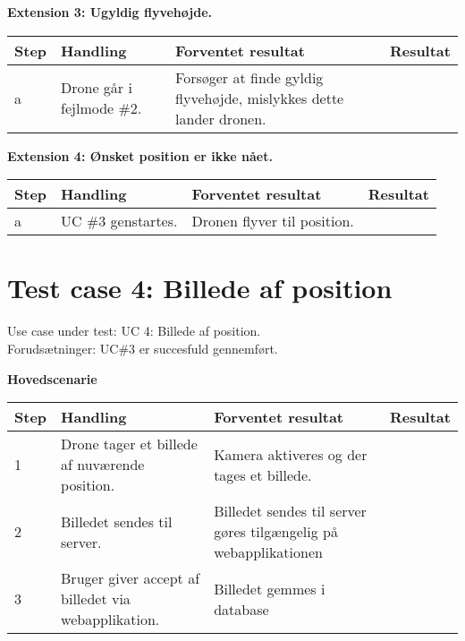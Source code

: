 \textbf{Extension 3: Ugyldig flyvehøjde.}
\begin{table}[H]
	\centering
		\begin{tabular}{|l|p{5 cm}|p{5 cm}|p{3.5 cm}|} 
		\hline
			Step & Handling & Forventet resultat & Resultat\\ \hline
			a & Drone går i fejlmode \#2. & Forsøger at finde gyldig \newline flyvehøjde, mislykkes dette lander dronen. & \\ \hline
		\end{tabular}
\end{table}

\textbf{Extension 4: Ønsket position er ikke nået.}
\begin{table}[H]
	\centering
		\begin{tabular}{|l|p{5 cm}|p{5 cm}|p{3.5 cm}|} 
		\hline
			Step & Handling & Forventet resultat & Resultat\\ \hline
			a & UC \#3 genstartes. & Dronen flyver til position. & \\ \hline
		\end{tabular}
\end{table}

\newpage

\section{Test case 4: Billede af position}
Use case under test: UC 4: Billede af position.\\
Forudsætninger:	UC\#3 er succesfuld gennemført.

\textbf{Hovedscenarie}
\begin{table}[H]
	\centering
		\begin{tabular}{|l|p{5 cm}|p{5 cm}|p{3.5 cm}|} 
		\hline
			Step & Handling & Forventet resultat & Resultat\\ \hline
			1 & Drone tager et billede af \newline nuværende position. & Kamera aktiveres og der \newline tages et billede. & \\ \hline
			2 & Billedet sendes til server. & Billedet sendes til server gøres tilgængelig på \newline webapplikationen &  \\ \hline
			3 & Bruger giver accept af billedet via webapplikation. & Billedet gemmes i database  & \\ \hline

		\end{tabular}
\end{table}


